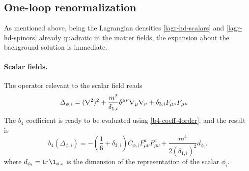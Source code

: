 \subsection{One-loop renormalization}
As  mentioned above, being the Lagrangian densities \eqref{lagr-hd-scalars} and \eqref{lagr-hd-spinors} already quadratic in the matter fields, the expansion about the background solution is immediate. 


\paragraph{Scalar fields.} The operator relevant to the scalar field reads
\begin{align}
\Delta_{\phi,i}
	& = ( { \mathcal{\nabla} }^2 )^2 
						+ \frac{m^2}{\delta_{1,i}}\delta^{\mu\nu} { \mathcal{\nabla} }_\mu{ \mathcal{\nabla} }_\nu
						+ \delta_{3,i} F_{\mu\nu} F_{\mu\nu}
\end{align}
 The $b_4$ coefficient is ready to be evaluated using \eqref{b4-coeff-4order}, and the result is
\begin{equation}\label{b4-hd-scalar}
b_4(\Delta_{\phi,i})
	=
	- \left( \frac{1}{6} + \delta_{3,i} \right)C_{\phi,i} F^a_{\mu\nu} F^a_{\mu\nu}
	+ \frac{ m^4 }{ 2 ( \delta_{1,i} )^2 } d_{\phi_i}.
\end{equation}
where
\(
d_{\phi_i}
	=
\tr \1_{\phi,i}
\)
is the dimension of the representation of the scalar $\phi_i$.




